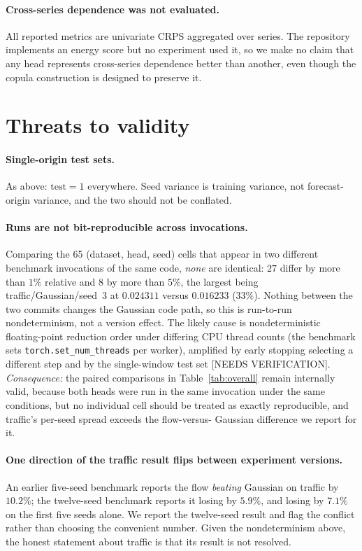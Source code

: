 \documentclass[11pt]{article}
\begin{document}
\paragraph{Cross-series dependence was not evaluated.} All reported metrics are
univariate CRPS aggregated over series. The repository implements an energy score but
no experiment used it, so we make no claim that any head represents cross-series
dependence better than another, even though the copula construction is designed to
preserve it.

\section{Threats to validity}
\label{sec:validity}

\paragraph{Single-origin test sets.} As above: $\text{test}=1$ everywhere.
Seed variance is training variance, not forecast-origin variance, and the two should
not be conflated.

\paragraph{Runs are not bit-reproducible across invocations.} Comparing the 65
(dataset, head, seed) cells that appear in two different benchmark invocations of the
same code, \emph{none} are identical: $27$ differ by more than $1\%$ relative and $8$
by more than $5\%$, the largest being traffic/Gaussian/seed~3 at $0.024311$ versus
$0.016233$ ($33\%$). Nothing between the two commits changes the Gaussian code path,
so this is run-to-run nondeterminism, not a version effect. The likely cause is
nondeterministic floating-point reduction order under differing CPU thread counts
(the benchmark sets \texttt{torch.set\_num\_threads} per worker), amplified by early
stopping selecting a different step and by the single-window test set
[NEEDS VERIFICATION]. \emph{Consequence:} the paired comparisons in
Table~\ref{tab:overall} remain internally valid, because both heads were run in the
same invocation under the same conditions, but no individual cell should be treated
as exactly reproducible, and traffic's per-seed spread exceeds the flow-versus-
Gaussian difference we report for it.

\paragraph{One direction of the traffic result flips between experiment versions.}
An earlier five-seed benchmark reports the flow \emph{beating} Gaussian on traffic by
$10.2\%$; the twelve-seed benchmark reports it losing by $5.9\%$, and losing by
$7.1\%$ on the first five seeds alone. We report the twelve-seed result and flag the
conflict rather than choosing the convenient number. Given the nondeterminism above,
the honest statement about traffic is that its result is not resolved.
\end{document}
